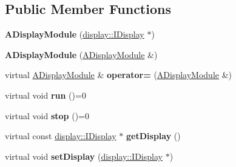 \subsection*{Public Member Functions}
\begin{DoxyCompactItemize}
\item 
\mbox{\label{classwood_box_1_1module_1_1_a_display_module_ac53bf5dc049361072a8e2174aa27c8b3}} 
{\bfseries A\+Display\+Module} (\mbox{\hyperlink{classwood_box_1_1display_1_1_i_display}{display\+::\+I\+Display}} $\ast$)
\item 
\mbox{\label{classwood_box_1_1module_1_1_a_display_module_af5124fa096f6ef17cae749a2dd8f5e0e}} 
{\bfseries A\+Display\+Module} (\mbox{\hyperlink{classwood_box_1_1module_1_1_a_display_module}{A\+Display\+Module}} \&)
\item 
\mbox{\label{classwood_box_1_1module_1_1_a_display_module_a41f26eb06fae670f21916724ac859302}} 
virtual \mbox{\hyperlink{classwood_box_1_1module_1_1_a_display_module}{A\+Display\+Module}} \& {\bfseries operator=} (\mbox{\hyperlink{classwood_box_1_1module_1_1_a_display_module}{A\+Display\+Module}} \&)
\item 
\mbox{\label{classwood_box_1_1module_1_1_a_display_module_a3b89ae22333f6fd4b9397ae24632b6d5}} 
virtual void {\bfseries run} ()=0
\item 
\mbox{\label{classwood_box_1_1module_1_1_a_display_module_a7cd0be127664613ee9c77a7d5b66c16e}} 
virtual void {\bfseries stop} ()=0
\item 
\mbox{\label{classwood_box_1_1module_1_1_a_display_module_a048c746e97a75a4170a06bbc43d5ec15}} 
virtual const \mbox{\hyperlink{classwood_box_1_1display_1_1_i_display}{display\+::\+I\+Display}} $\ast$ {\bfseries get\+Display} ()
\item 
\mbox{\label{classwood_box_1_1module_1_1_a_display_module_a1fd524a64d867a9e4d23b35ea8c6e43f}} 
virtual void {\bfseries set\+Display} (\mbox{\hyperlink{classwood_box_1_1display_1_1_i_display}{display\+::\+I\+Display}} $\ast$)
\end{DoxyCompactItemize}
